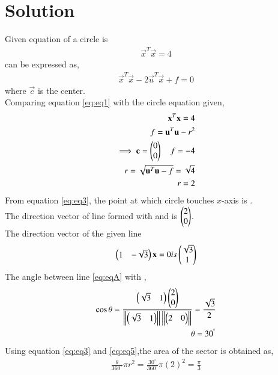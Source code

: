 \documentclass[journal,12pt,twocolumn]{IEEEtran}
\newcommand{\norm}[1]{\left\lVert#1\right\rVert}
\begin{document}
\section{Solution}
Given equation of a circle is 
    \begin{align}
        \vec{x}^{T} \vec{x} =4
    \end{align}
can be expressed as,
\begin{align}
    \vec{x}^{T}\vec{x} - 2\vec{u}^{T}\vec{x} +f=0 \label{eq:eq1}
\end{align}
where $\vec{c}$ is the center.\\
Comparing equation \eqref{eq:eq1} with the circle equation given,
\begin{align}
    \mathbf{x}^{T}\mathbf{x} =4 \label{eq:eq2}\\
    \quad f = \mathbf{u}^T \mathbf{u}-r^2 \\
    \implies \mathbf{c} = \begin{pmatrix}0\\0\end{pmatrix} \quad f=-4\\
    r=\sqrt{\mathbf{u}^{T}\mathbf{u}-f} = \sqrt{4}\\
    r=2 \label{eq:eq3}
\end{align}
From equation \eqref{eq:eq3}, the point at which circle touches $x$-axis is .\\
The direction vector of line formed with  and  is  $\begin{pmatrix}2\\0\end{pmatrix}$.\\
The direction vector of the given line 
\begin{align}
    \begin{pmatrix}1&-\sqrt{3}\end{pmatrix}\mathbf{x}=0 is \begin{pmatrix}\sqrt{3}\\1\end{pmatrix} \label{eq:eqA}
\end{align}
The angle between line \eqref{eq:eqA} with  ,
\begin{align}
    \cos\theta = \frac{\myvec{\sqrt{3}&1}\myvec{2\\0}}{\norm{\myvec{\sqrt{3}&1}}\norm{\myvec{2&0}}}=\frac{\sqrt{3}}{2} \label{eq:solutions/7/eq:eq4}\\
    \theta = 30^{\degree}\label{eq:eq5}
\end{align}
Using equation \eqref{eq:eq3} and \eqref{eq:eq5},the area of the sector is obtained as,
\begin{align}
    \frac{\theta}{360^{\circ}}\pi r^2 = \frac{30^{\circ}}{360^{\circ}}\pi (2)^2=\frac{\pi}{3} \label{eq:eq6}
\end{align}
\end{document}
